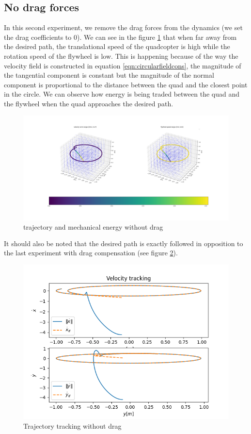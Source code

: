 \subsection{No drag forces}
In this second experiment, we remove the drag forces from the dynamics (we set the drag coefficients to 0).
We can see in the figure \ref{fig:pythonnodrag} that when far away from the desired path, the translational speed of the quadcopter is high while the rotation speed of the flywheel is low.
This is happening because of the way the velocity field is constructed in equation \ref{eqn:circularfieldcons}, 
the magnitude of the tangential component is constant but the magnitude of the normal component is proportional to the distance between the quad and the closest point in the circle.
We can observe how energy is being traded between the quad and the flywheel when the quad approaches the desired path.
\begin{figure}[h!]
   \centering
   \includegraphics[width=\linewidth]{Images/python-nodrag.png}
   \caption{trajectory and mechanical energy without drag }
   \label{fig:pythonnodrag}
\end{figure}
It should also be noted that the desired path is exactly followed in opposition to the last experiment with drag compensation (see figure \ref{fig:trajtracknodrag}).
\begin{figure}[h!]
   \centering
   \includegraphics[width=\linewidth]{Images/velocitytrackingpythonnodrag.png}
   \caption{Trajectory tracking without drag}
   \label{fig:trajtracknodrag}
\end{figure}
